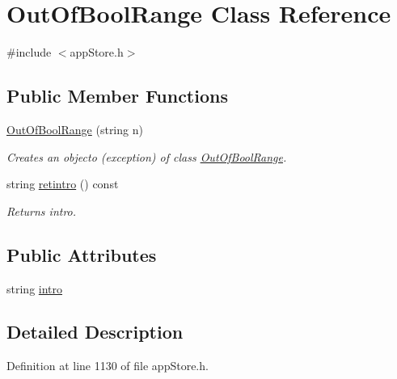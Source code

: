 \hypertarget{class_out_of_bool_range}{\section{Out\-Of\-Bool\-Range Class Reference}
\label{class_out_of_bool_range}
}


{\ttfamily \#include $<$app\-Store.\-h$>$}

\subsection*{Public Member Functions}
\begin{DoxyCompactItemize}
\item 
\hyperlink{class_out_of_bool_range_a13c804a543fd56d837e0b6d6992a7210}{Out\-Of\-Bool\-Range} (string n)
\begin{DoxyCompactList}\small\item\em Creates an objecto (exception) of class \hyperlink{class_out_of_bool_range}{Out\-Of\-Bool\-Range}. \end{DoxyCompactList}\item 
string \hyperlink{class_out_of_bool_range_a78d63f3771ab33f49c74d936d6034277}{retintro} () const 
\begin{DoxyCompactList}\small\item\em Returns intro. \end{DoxyCompactList}\end{DoxyCompactItemize}
\subsection*{Public Attributes}
\begin{DoxyCompactItemize}
\item 
string \hyperlink{class_out_of_bool_range_a1acf2deb240e2343b8cb317f07ac0f27}{intro}
\end{DoxyCompactItemize}


\subsection{Detailed Description}


Definition at line 1130 of file app\-Store.\-h.



